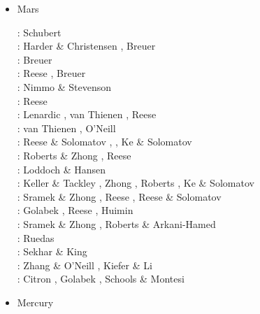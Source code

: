 \begin{itemize}
\item Mars \\
\begin{scriptsize}
\nineteenninety: Schubert \etal \cite{scbg90}\\
\nineteenninetysix: Harder \& Christensen \cite{hach96}, Breuer \etal \cite{brzy96}\\
\nineteenninetyseven: Breuer \etal \cite{brys97}\\
\nineteenninetyeight: Reese \etal \cite{resm98}, Breuer \etal \cite{brys98}\\
\twothousandone: Nimmo \& Stevenson \cite{nist01}\\
\twothousandtwo: Reese \etal \cite{resb02}\\
\twothousandfour: Lenardic \etal \cite{lenm04}, van Thienen \etal \cite{vavv04c}, 
                  Reese \etal \cite{resb04}\\
\twothousandfive: van Thienen \etal \cite{vavv05}, O'Neill \etal \cite{onml05}\\
\twothousandsix: Reese \& Solomatov \cite{reso06}, \cite{losh06,rozh06}, Ke \& Solomatov \cite{keso06}\\
\twothousandseven: Roberts \& Zhong \cite{rozh07}, Reese \etal \cite{reso07b}\\
\twothousandeight: Loddoch \& Hansen \cite{loha08}\\
\twothousandnine: Keller \& Tackley \cite{keta09}, Zhong \cite{zhon09}, 
                  Roberts \etal \cite{rolm09}, Ke \& Solomatov \cite{keso09}\\
\twothousandten: Sramek \& Zhong \cite{srzh10}, Reese \etal \cite{reos10}, 
                 Reese \& Solomatov \cite{reso10}\\
\twothousandeleven: Golabek \etal \cite{gokg11}, Reese \etal \cite{reos11}, Huimin \etal \cite{jizl11}\\
\twothousandtwelve: Sramek \& Zhong \cite{srzh12}, Roberts \& Arkani-Hamed \cite{roar12}\\
\twothousandthirteen: Ruedas \etal \cite{ruts13}\\
\twothousandfourteen: Sekhar \& King \cite{seki14}\\
\twothousandsixteen: Zhang \& O'Neill \cite{zhon16}, Kiefer \& Li \cite{kili16}\\
\twothousandeighteen: Citron \etal \cite{cimt18}, Golabek \etal \cite{goej18}, 
                      Schools \& Montesi \cite{scmo18}
\end{scriptsize}

\item Mercury 


\end{itemize}
